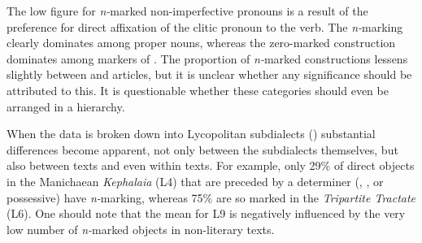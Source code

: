 \documentclass[output=paper]{LSP/langsci}
\begin{document}
\begin{table}

\caption{ Percentage of marked objects in Lycopolitan in DOM-sensitive contexts (affirmative sentences only)}\label{06-en-tab:3}
\end{table}

The low figure for \textit{n-}marked non-imperfective pronouns is a result of the preference for direct affixation of the clitic pronoun to the verb. The \textit{n-}marking clearly dominates among proper nouns, whereas the zero-marked construction dominates among markers of . The proportion of \textit{n-}marked constructions lessens slightly between  and  articles, but it is unclear whether any significance should be attributed to this. It is questionable whether these categories should even be arranged in a hierarchy.

When the data is broken down into Lycopolitan subdialects () substantial differences become apparent, not only between the subdialects themselves, but also between texts and even within texts. For example, only 29\% of direct objects in the Manichaean \textit{Kephalaia} (L4) that are preceded by a determiner (, , or possessive) have \textit{n-}marking, whereas 75\% are so marked in the \textit{Tripartite Tractate} (L6). One should note that the mean for L9 is negatively influenced by the very low number of \textit{n-}marked objects in non-literary texts.
\end{document}
